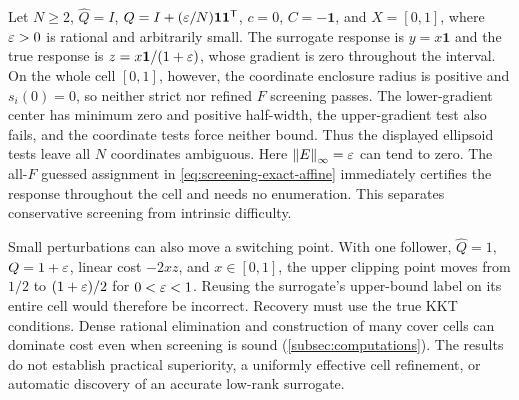 \begin{example}
\label{ex:screening-conservatism}
Let $N\ge2$, $\widehat Q=I$, $Q=I+(\varepsilon/N)\mathbf1\mathbf1^{\mathsf T}$,
$c=0$, $C=-\mathbf1$, and $X=[0,1]$, where $\varepsilon>0$ is rational
and arbitrarily small. The surrogate response is $y=x\mathbf1$ and
the true response is $z=x\mathbf1/(1+\varepsilon)$, whose gradient is zero
throughout the interval. On the whole cell $[0,1]$, however, the
coordinate enclosure radius is positive and $s_i(0)=0$, so neither
strict nor refined $F$ screening passes. The lower-gradient center
has minimum zero and positive half-width, the upper-gradient test
also fails, and the coordinate tests force neither bound. Thus the
displayed ellipsoid tests leave all $N$ coordinates ambiguous.
Here $\left\lVert E\right\rVert_\infty=\varepsilon$ can tend to zero. The all-$F$ guessed
assignment in \eqref{eq:screening-exact-affine} immediately certifies
the response throughout the cell and needs no enumeration. This
separates conservative screening from intrinsic difficulty.
\end{example}

Small perturbations can also move a switching point. With one follower,
$\widehat Q=1$, $Q=1+\varepsilon$, linear cost $-2xz$, and $x\in[0,1]$,
the upper clipping point moves from $1/2$ to $(1+\varepsilon)/2$ for
$0<\varepsilon<1$. Reusing the surrogate's upper-bound label on its entire
cell would therefore be incorrect. Recovery must use the true KKT
conditions. Dense rational elimination and construction of many cover
cells can dominate cost even when screening is sound
(\cref{subsec:computations}). The results do not establish practical superiority, a uniformly effective cell
refinement, or automatic discovery of an accurate low-rank surrogate.
